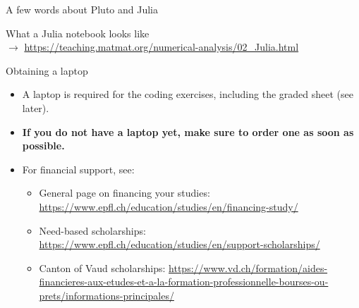 \begin{frame}{A few words about Pluto and Julia}
    \begin{center}
        \Large{What a Julia notebook looks like} \\[3em]
        {\normalsize\smaller[3]
            \hspace{-1.8cm}
            \hspace{0.2cm}$\rightarrow$\hspace{0.2cm}
            \url{https://teaching.matmat.org/numerical-analysis/02_Julia.html}}
    \end{center}
\end{frame}

\begin{frame}{Obtaining a laptop}
    \begin{itemize}
        \item A laptop is required for the coding exercises, including the graded sheet (see later).

        \item \textbf{If you do not have a laptop yet, make sure to order one as soon as possible.}
        \item For financial support, see:
        \begin{itemize}
            \item General page on financing your studies: \url{https://www.epfl.ch/education/studies/en/financing-study/}
            \item Need-based scholarships: \url{https://www.epfl.ch/education/studies/en/support-scholarships/}
            \item Canton of Vaud scholarships: \url{https://www.vd.ch/formation/aides-financieres-aux-etudes-et-a-la-formation-professionnelle-bourses-ou-prets/informations-principales/}
        \end{itemize}
    \end{itemize}
\end{frame}


